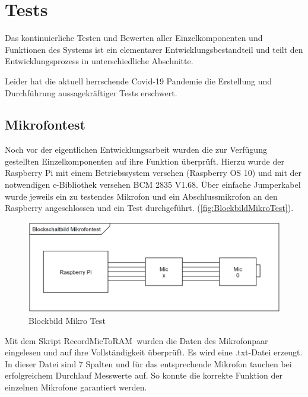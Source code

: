 \section{Tests}

Das kontinuierliche Testen und Bewerten aller Einzelkomponenten und Funktionen des Systems ist ein elementarer Entwicklungsbestandteil und teilt den Entwicklungsprozess in unterschiedliche Abschnitte.

Leider hat die aktuell herrschende Covid-19 Pandemie die Erstellung und Durchführung aussagekräftiger Tests erschwert. 

\subsection{Mikrofontest}

Noch vor der eigentlichen Entwicklungsarbeit wurden die zur Verfügung gestellten Einzelkomponenten auf ihre Funktion überprüft. Hierzu wurde der Raspberry Pi mit einem Betriebssystem versehen (Raspberry OS 10) und mit der notwendigen c-Bibliothek versehen BCM 2835 V1.68. Über einfache Jumperkabel wurde jeweils ein zu testendes Mikrofon und ein Abschlussmikrofon an den Raspberry angeschlossen und ein Test durchgeführt. (\autoref{fig:BlockbildMikroTest}).

\begin{figure}[h]
	\begin{center}
		\includegraphics[scale=0.1]{Sections/Tests/BlockbildMikroTest}
	\end{center}
	\caption{Blockbild Mikro Test}
	\label{fig:BlockbildMikroTest}
\end{figure}

Mit dem Skript \glqq RecordMicToRAM\grqq\ wurden die Daten des Mikrofonpaar eingelesen und auf ihre Vollständigkeit überprüft. Es wird eine .txt-Datei erzeugt. In dieser Datei sind 7 Spalten und für das entsprechende Mikrofon tauchen bei erfolgreichem Durchlauf Messwerte auf. So konnte die korrekte Funktion der einzelnen Mikrofone garantiert werden.

